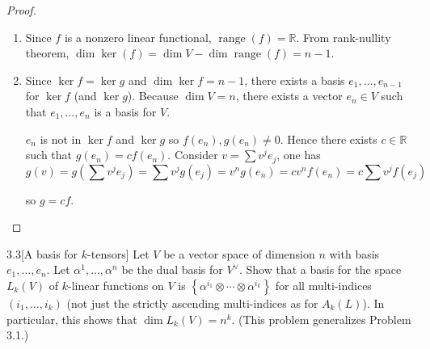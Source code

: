 \begin{proof}
	\begin{enumerate}[label={(\alph*)}]
		\item Since \( f \) is a nonzero linear functional, \( \operatorname{range}(f) = \mathbb{R} \). From rank-nullity theorem, \( \dim \ker(f) = \dim V - \dim \operatorname{range}(f) = n - 1 \).
		\item Since \( \ker f = \ker g \) and \( \dim \ker f = n - 1 \), there exists a basis \( e_{1}, \ldots, e_{n-1} \) for \( \ker f \) (and \( \ker g \)). Because \( \dim V = n \), there exists a vector \( e_{n} \in V \) such that \( e_{1}, \ldots, e_{n} \) is a basis for \( V \).

		      \( e_{n} \) is not in \( \ker f \) and \( \ker g \) so \( f(e_{n}), g(e_{n}) \ne 0 \). Hence there exists \( c \in \mathbb{R} \) such that \( g(e_{n}) = cf(e_{n}) \). Consider \( v = \sum v^{j}e_{j} \), one has
		      \[
			      g(v) = g\left(\sum v^{j}e_{j}\right) = \sum v^{j}g(e_{j}) = v^{n}g(e_{n}) = cv^{n}f(e_{n}) = c\sum v^{j}f(e_{j})
		      \]

		      so \( g = cf \).\qedhere
	\end{enumerate}
\end{proof}

\begin{problem}{3.3}[A basis for \( k \)-tensors]
Let \( V \) be a vector space of dimension \( n \) with basis \( e_{1}, \ldots, e_{n} \). Let \( \alpha^{1}, \ldots, \alpha^{n} \) be the dual basis for \( V^{\vee} \). Show that a basis for the space \( L_{k}(V) \) of \( k \)-linear functions on \( V \) is \( \left\{ \alpha^{i_{1}} \otimes \cdots \otimes \alpha^{i_{k}} \right\} \) for all multi-indices \( (i_{1}, \ldots, i_{k}) \) (not just the strictly ascending multi-indices as for \( A_{k}(L) \)). In particular, this shows that \( \dim L_{k}(V) = n^{k} \). (This problem generalizes Problem 3.1.)
\end{problem}

